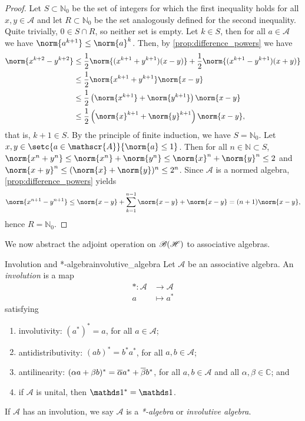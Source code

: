 \begin{proof}
    Let \(S\subset \mathbb{N}_0\) be the set of integers for which the first inequality holds for all \(x, y \in \mathscr{A}\) and let \(R \subset \mathbb{N}_0\) be the set analogously defined for the second inequality. Quite trivially, \(0 \in S \cap R\), so neither set is empty. Let \(k \in S\), then for all \(a \in \mathscr{A}\) we have \(\norm{a^{k+1}} \leq \norm{a}^k\). Then, by \cref{prop:difference_powers} we have
    \begin{align*}
        \norm{x^{k+2} - y^{k+2}} &\leq \frac12 \norm{(x^{k+1} + y^{k+1})(x - y)} + \frac12\norm{(x^{k+1} - y^{k+1})(x+y)}\\
                                 &\leq \frac12 \norm{x^{k+1} + y^{k+1}} \norm{x - y}\\
                                 &\leq \frac12\left(\norm{x^{k+1}} + \norm{y^{k+1}}\right)\norm{x - y}\\
                                 &\leq \frac12\left(\norm{x}^{k+1} + \norm{y}^{k+1}\right)\norm{x - y},
    \end{align*}
    that is, \(k + 1 \in S\). By the principle of finite induction, we have \(S = \mathbb{N}_0\). Let \(x, y \in \setc{a \in \mathscr{A}}{\norm{a} \leq 1}\). Then for all \(n \in \mathbb{N} \subset S\), \(\norm{x^n + y^n} \leq \norm{x^n} + \norm{y^n} \leq \norm{x}^n + \norm{y}^n\leq 2\) and \(\norm{x + y}^n \leq (\norm{x} + \norm{y})^n \leq 2^n\). Since \(\mathscr{A}\) is a normed algebra, \cref{prop:difference_powers} yields
    \begin{equation*}
        \norm{x^{n+1} - y^{n+1}} \leq \norm{x - y} + \sum_{k=1}^{n-1} \norm{x-y} + \norm{x-y} = (n+1)\norm{x-y},
    \end{equation*}
    hence \(R = \mathbb{N}_0\).
\end{proof}

We now abstract the adjoint operation on \(\mathscr{B}(\mathscr{H})\) to associative algebras.
\begin{definition}{Involution and *-algebra}{involutive_algebra}
    Let \(\mathscr{A}\) be an associative algebra. An \emph{involution} is a map
    \begin{align*}
        * : \mathscr{A} &\to \mathscr{A}\\
                      a &\mapsto a^*
    \end{align*}
    satisfying
    \begin{enumerate}[label=(\alph*)]
        \item involutivity: \((a^*)^* = a\), for all \(a \in \mathscr{A}\);
        \item antidistributivity: \((ab)^* = b^* a^*\), for all \(a, b \in \mathscr{A}\);
        \item antilinearity: \((\alpha a + \beta b)^* = \overline{\alpha}a^* + \overline{\beta}b^*\), for all \(a,b \in \mathscr{A}\) and all \(\alpha, \beta \in \mathbb{C}\); and
        \item if \(\mathscr{A}\) is unital, then \(\unity^* = \unity\).
    \end{enumerate}
    If \(\mathscr{A}\) has an involution, we say \(\mathscr{A}\) is a \emph{*-algebra} or \emph{involutive algebra}.
\end{definition}

